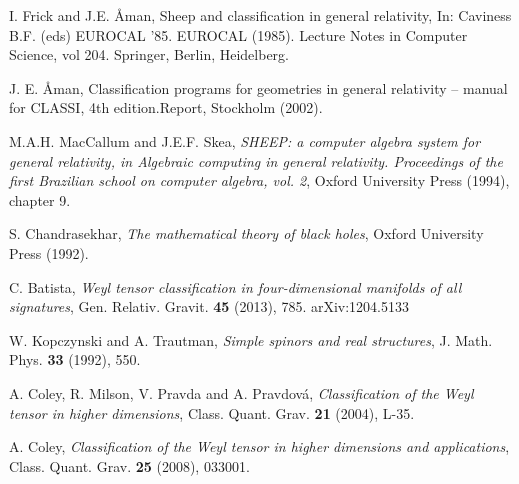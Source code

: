 \documentclass[twocolumn,prd,aps,showpacs,showkeys,amsmath,amssymb]{revtex4-1}
\begin{document}
\begin{thebibliography}{99}
 I. Frick and J.E. {\AA}man, Sheep and classification in general relativity,  In: Caviness B.F. (eds) EUROCAL '85. EUROCAL (1985). Lecture Notes in Computer Science, vol 204. Springer, Berlin, Heidelberg.

 J. E. {\AA}man, Classiﬁcation programs for geometries in general relativity – manual for CLASSI, 4th edition.Report, Stockholm (2002).

 M.A.H. MacCallum and J.E.F. Skea, \textit{SHEEP: a computer algebra system for
general relativity, in Algebraic computing in general relativity. Proceedings of the
ﬁrst Brazilian school on computer algebra, vol. 2}, Oxford University Press (1994), chapter 9.

 S. Chandrasekhar, \textit{The mathematical theory of black holes}, Oxford University Press (1992).

 C. Batista, \textit{Weyl tensor classification in four-dimensional manifolds of all signatures}, Gen. Relativ. Gravit. \textbf{45} (2013),
    785. arXiv:1204.5133

 W. Kopczynski and A. Trautman, \textit{Simple spinors and real structures}, J. Math. Phys. \textbf{33} (1992), 550.

 A. Coley, R. Milson, V. Pravda and A. Pravdov\'{a}, \textit{Classification of the Weyl tensor in higher dimensions}, Class. Quant. Grav.
    \textbf{21} (2004), L-35.



  A. Coley, \textit{Classification of the Weyl tensor in higher dimensions and applications}, Class. Quant. Grav. \textbf{25} (2008),
    033001.









\end{thebibliography}
\end{document}
